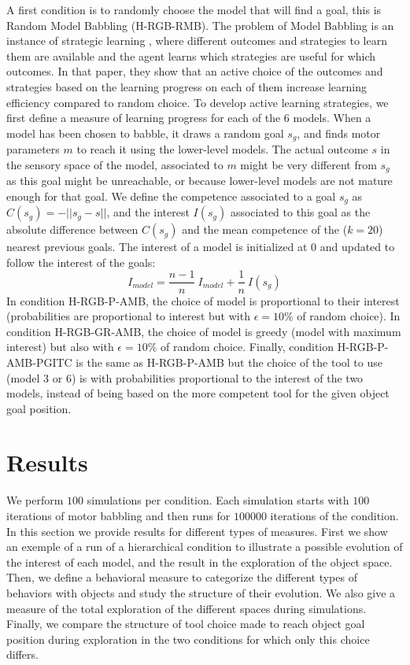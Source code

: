 \documentclass[10pt,letterpaper]{article}
\begin{document}
			A first condition is to randomly choose the model that will find a goal, this is Random Model Babbling (H-RGB-RMB).
			The problem of Model Babbling is an instance of strategic learning \cite{nguyen2012}, 
			where different outcomes and strategies to learn them are available and the agent learns which strategies are useful for which outcomes.
			In that paper, they show that an active choice of the outcomes and strategies based on the learning progress on each of them increase learning efficiency compared to random choice.
			To develop active learning strategies, we first define a measure of learning progress for each of the $6$ models.
			When a model has been chosen to babble, it draws a random goal $s_g$, and finds motor parameters $m$ to reach it using the lower-level models.
			The actual outcome $s$ in the sensory space of the model, associated to $m$ might be very different from $s_g$ as this goal might be unreachable, or because lower-level models are not mature enough for that goal.
			We define the competence associated to a goal $s_g$ as $C(s_g)=-||s_g-s||$, and the interest $I(s_g)$ associated to this goal
			as the absolute difference between $C(s_g)$ and the mean competence of the ($k=20$) nearest previous goals.
			The interest of a model is initialized at $0$ and updated to follow the interest of the goals:
			\begin{equation}
				I_{model}=\frac{n-1}{n}~I_{model} + \frac{1}{n}~I(s_g)
			\end{equation}
			In condition H-RGB-P-AMB, the choice of model is proportional to their interest (probabilities are proportional to interest but with $\epsilon=10\%$ of random choice). 
			In condition H-RGB-GR-AMB, the choice of model is greedy (model with maximum interest) but also with $\epsilon=10\%$ of random choice.
			Finally, condition H-RGB-P-AMB-PGITC is the same as H-RGB-P-AMB but the choice of the tool to use (model $3$ or $6$) is with probabilities proportional to the interest of the two models, 
			instead of being based on the more competent tool for the given object goal position.

	
%


\section{Results}
	
	We perform $100$ simulations per condition. 
	Each simulation starts with $100$ iterations of motor babbling and then runs for $100000$ iterations of the condition.
	In this section we provide results for different types of measures. 
	First we show an exemple of a run of a hierarchical condition to illustrate a possible evolution of the interest of each model, and the result in the exploration of the object space.
	Then, we define a behavioral measure to categorize the different types of behaviors with objects and study the structure of their evolution.
	We also give a measure of the total exploration of the different spaces during simulations.
	Finally, we compare the structure of tool choice made to reach object goal position during exploration in the two conditions for which only this choice differs.
		
\end{document}
